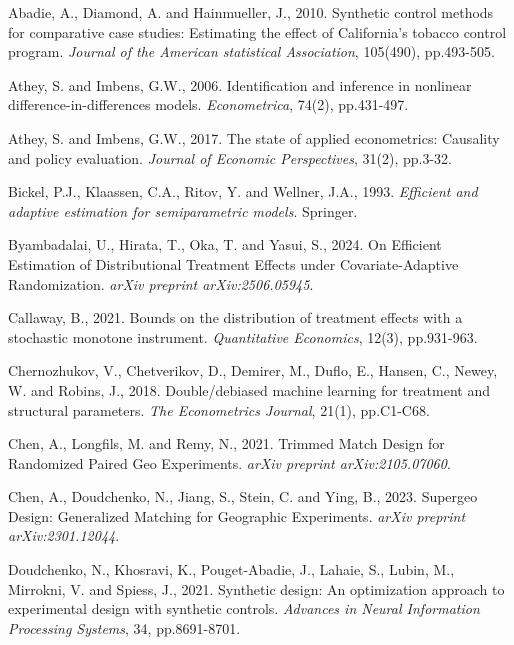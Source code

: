 \documentclass[final,3p,fleqn, 10pt]{elsarticle}
\begin{document}
\vskip 0.2in
\begin{thebibliography}{99}

Abadie, A., Diamond, A. and Hainmueller, J., 2010. Synthetic control methods for comparative case studies: Estimating the effect of California’s tobacco control program. \textit{Journal of the American statistical Association}, 105(490), pp.493-505.

Athey, S. and Imbens, G.W., 2006. Identification and inference in nonlinear difference-in-differences models. \textit{Econometrica}, 74(2), pp.431-497.

Athey, S. and Imbens, G.W., 2017. The state of applied econometrics: Causality and policy evaluation. \textit{Journal of Economic Perspectives}, 31(2), pp.3-32.

Bickel, P.J., Klaassen, C.A., Ritov, Y. and Wellner, J.A., 1993. \textit{Efficient and adaptive estimation for semiparametric models}. Springer.

Byambadalai, U., Hirata, T., Oka, T. and Yasui, S., 2024. On Efficient Estimation of Distributional Treatment Effects under Covariate-Adaptive Randomization. \textit{arXiv preprint arXiv:2506.05945}.

Callaway, B., 2021. Bounds on the distribution of treatment effects with a stochastic monotone instrument. \textit{Quantitative Economics}, 12(3), pp.931-963.

Chernozhukov, V., Chetverikov, D., Demirer, M., Duflo, E., Hansen, C., Newey, W. and Robins, J., 2018. Double/debiased machine learning for treatment and structural parameters. \textit{The Econometrics Journal}, 21(1), pp.C1-C68.

Chen, A., Longfils, M. and Remy, N., 2021. Trimmed Match Design for Randomized Paired Geo Experiments. \textit{arXiv preprint arXiv:2105.07060}.

Chen, A., Doudchenko, N., Jiang, S., Stein, C. and Ying, B., 2023. Supergeo Design: Generalized Matching for Geographic Experiments. \textit{arXiv preprint arXiv:2301.12044}.

Doudchenko, N., Khosravi, K., Pouget-Abadie, J., Lahaie, S., Lubin, M., Mirrokni, V. and Spiess, J., 2021. Synthetic design: An optimization approach to experimental design with synthetic controls. \textit{Advances in Neural Information Processing Systems}, 34, pp.8691-8701.


\end{thebibliography}
\end{document}

